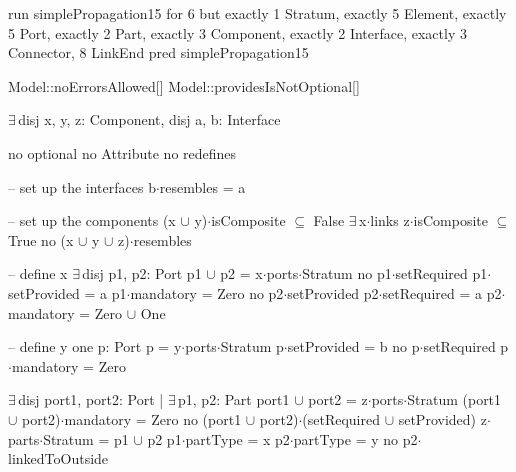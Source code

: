 run simplePropagation15 for 6 but exactly 1 Stratum, exactly 5 Element, exactly 5 Port, exactly 2 Part, exactly 3 Component, exactly 2 Interface, exactly 3 Connector, 8 LinkEnd
pred simplePropagation15
{
  Model::noErrorsAllowed[]
  Model::providesIsNotOptional[]

  $\exists\,$disj x, y, z: Component,
       disj a, b: Interface
  {
    no optional
    no Attribute
    no redefines
  
    -- set up the interfaces
    b$\cdot$resembles = a
  
    -- set up the components
    (x $\cup$ y)$\cdot$isComposite $\subseteq$ False
    $\exists\,$x$\cdot$links
    z$\cdot$isComposite $\subseteq$ True
    no (x $\cup$ y $\cup$ z)$\cdot$resembles
    
    -- define x
    $\exists\,$disj p1, p2: Port
    {
      p1 $\cup$ p2 = x$\cdot$ports$\cdot$Stratum
      no p1$\cdot$setRequired
      p1$\cdot$setProvided = a
      p1$\cdot$mandatory = Zero
      no p2$\cdot$setProvided
      p2$\cdot$setRequired = a
      p2$\cdot$mandatory = Zero $\cup$ One
    }
    
    -- define y
    one p: Port
    {
      p = y$\cdot$ports$\cdot$Stratum
      p$\cdot$setProvided = b
      no p$\cdot$setRequired
      p$\cdot$mandatory = Zero
    }
    
    $\exists\,$disj port1, port2: Port | $\exists\,$p1, p2: Part
    {
      port1 $\cup$ port2 = z$\cdot$ports$\cdot$Stratum
      (port1 $\cup$ port2)$\cdot$mandatory = Zero
      no (port1 $\cup$ port2)$\cdot$(setRequired $\cup$ setProvided)
      z$\cdot$parts$\cdot$Stratum = p1 $\cup$ p2
      p1$\cdot$partType = x
      p2$\cdot$partType = y
      no p2$\cdot$linkedToOutside
    }
  }
}

